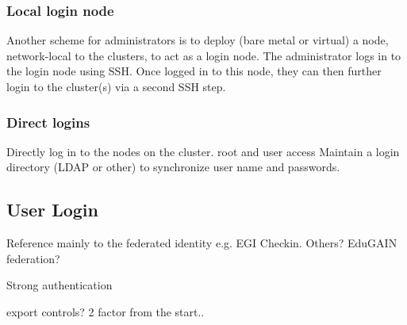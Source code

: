 \documentclass[12pt,a4paper]{article}
\begin{document}
\subsubsection{Local login node}
\label{ssec:local-login-node}

Another scheme for administrators is to deploy (bare metal or virtual) a node, network-local to the \ED clusters, to act as a login node.
The administrator logs in to the login node using SSH.
Once logged in to this node, they can then further login to the cluster(s) via a second SSH step.

\subsubsection{Direct logins}
\label{ssec:direct}

Directly log in to the nodes on the cluster.
root and user access
Maintain a login directory (LDAP or other) to synchronize user name and passwords.


\subsection{User Login}
\label{sec:users}

Reference mainly to the federated identity e.g. EGI Checkin. Others? EduGAIN federation?

Strong authentication

export controls? 2 factor from the start..




\newpage
{}

\end{document}
